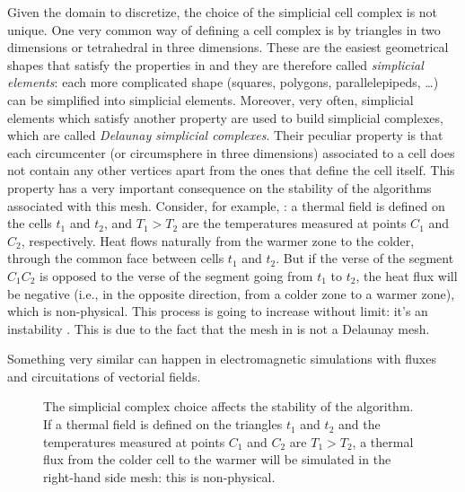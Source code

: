 Given the domain to discretize, the choice of the simplicial cell
complex is not unique. One very common way of defining a cell complex
is by triangles in two dimensions or tetrahedral in three
dimensions. These are the easiest geometrical shapes that satisfy the
properties in  and they are therefore
called \emph{simplicial elements}: each more complicated shape
(squares, polygons, parallelepipeds, \ldots) can be simplified into
simplicial elements. Moreover, very often, simplicial elements which
satisfy another property are used to build simplicial complexes, which
are called \emph{Delaunay simplicial complexes}. Their peculiar
property is that each circumcenter (or circumsphere in three
dimensions) associated to a cell does not contain any other vertices
apart from the ones that define the cell itself. This property has a
very important consequence on the stability of the algorithms
associated with this mesh. Consider, for example,
: a thermal field is defined on the cells
$t_1$ and $t_2$, and $T_1 > T_2$ are the
temperatures measured at points $C_1$ and $C_2$, respectively. Heat
flows naturally from the warmer zone to the colder, through the common face
between cells $t_1$ and $t_2$. But if the verse of the segment
$C_1C_2$ is opposed to the verse of the segment going from $t_1$ to
$t_2$, the heat flux will be negative (i.e., in the opposite
direction, from a colder zone to a warmer zone), which is
non-physical. This process is going to increase without limit: it's an
instability \cite{tonti_formulazione}. This is due to the fact that
the mesh in  is not a Delaunay mesh.

Something very similar can happen in electromagnetic simulations with
fluxes and circuitations of vectorial fields.

\begin{figure}[htbp]
  \begin{center}
  \end{center}
  \caption{The simplicial complex choice affects the stability of
    the algorithm. If a thermal field is defined on the
    triangles $t_1$ and $t_2$ and the temperatures measured at
    points $C_1$ and $C_2$ are $T_1 > T_2$, a thermal flux from the
    colder cell to the warmer will be simulated in the
    right-hand side mesh: this is non-physical.}
  \label{fig:tonti_thermal}
\end{figure}

